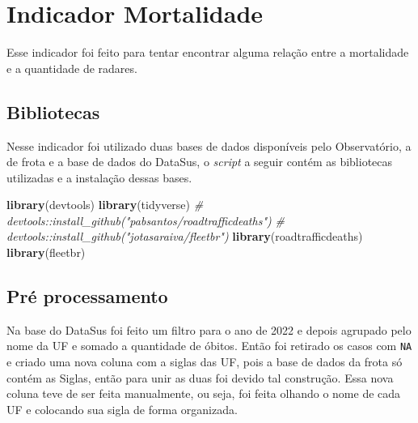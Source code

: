 \documentclass[
]{book}
\newenvironment{Shaded}{\begin{snugshade}}{\end{snugshade}}
\newcommand{\CommentTok}[1]{\textcolor[rgb]{0.56,0.35,0.01}{\textit{#1}}}
\newcommand{\FunctionTok}[1]{\textcolor[rgb]{0.13,0.29,0.53}{\textbf{#1}}}
\newcommand{\NormalTok}[1]{#1}
\begin{document}
\chapter{Indicador Mortalidade}\label{indicador-mortalidade}

Esse indicador foi feito para tentar encontrar alguma relação entre a mortalidade e a quantidade de radares.

\section{Bibliotecas}\label{bibliotecas-2}

Nesse indicador foi utilizado duas bases de dados disponíveis pelo Observatório, a de frota e a base de dados do DataSus, o \emph{script} a seguir contém as bibliotecas utilizadas e a instalação dessas bases.

\begin{Shaded}
\begin{Highlighting}[]
\FunctionTok{library}\NormalTok{(devtools)}
\FunctionTok{library}\NormalTok{(tidyverse)}
\CommentTok{\# devtools::install\_github("pabsantos/roadtrafficdeaths")}
\CommentTok{\# devtools::install\_github("jotasaraiva/fleetbr")}
\FunctionTok{library}\NormalTok{(roadtrafficdeaths)}
\FunctionTok{library}\NormalTok{(fleetbr)}
\end{Highlighting}
\end{Shaded}

\section{Pré processamento}\label{pruxe9-processamento-2}

Na base do DataSus foi feito um filtro para o ano de 2022 e depois agrupado pelo nome da UF e somado a quantidade de óbitos. Então foi retirado os casos com \texttt{NA} e criado uma nova coluna com a siglas das UF, pois a base de dados da frota só contém as Siglas, então para unir as duas foi devido tal construção. Essa nova coluna teve de ser feita manualmente, ou seja, foi feita olhando o nome de cada UF e colocando sua sigla de forma organizada.
\end{document}
